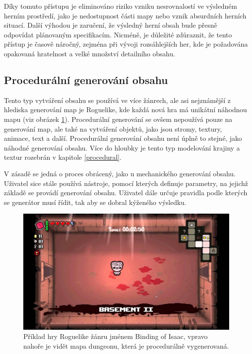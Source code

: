 Díky tomuto přístupu je eliminováno riziko vzniku nesrovnalostí ve výsledném herním prostředí, jako je nedostupnost části mapy nebo vznik absurdních herních situací. Další výhodou je zaručení, že výsledný herní obsah bude přesně odpovídat plánovaným specifikacím. Nicméně, je důležité zdůraznit, že tento přístup je časově náročný, zejména při vývoji rozsáhlejších her, kde je požadována opakovaná hratelnost a velké množství detailního obsahu.

\subsection{Procedurální generování obsahu}
Tento typ vytváření obsahu se používá ve více žánrech, ale asi nejznámější z hlediska generování map je Roguelike, kde každá nová hra má unikátní náhodnou mapu (viz obrázek \ref{bindingOfIsaac}). Procedurální generování se ovšem nepoužívá pouze na generování map, ale také na vytváření objektů, jako jsou stromy, textury, animace, text a další. Procedurální generování obsahu není úplně to stejné, jako náhodné generování obsahu. Více do hloubky je tento typ modelování krajiny a textur rozebrán v kapitole \ref{procedural}.

V zásadě se jedná o proces obrácený, jako u mechanického generování obsahu. Uživatel sice stále používá nástroje, pomocí kterých definuje parametry, na jejichž základě se provádí generování obsahu. Uživatel dále určuje pravidla podle kterých se generátor musí řídit, tak aby se dobral kýženého výsledku.

\begin{figure}[H]
	\centering
	\includegraphics[scale=0.28]{obrazky-figures/BindingOfIsaac.jpg}
	\caption{Příklad hry Roguelike žánru jménem Binding of Isaac, vpravo nahoře je vidět mapa dungeonu, která je procedurálně vygenerovaná.}
	\label{bindingOfIsaac}
\end{figure}

